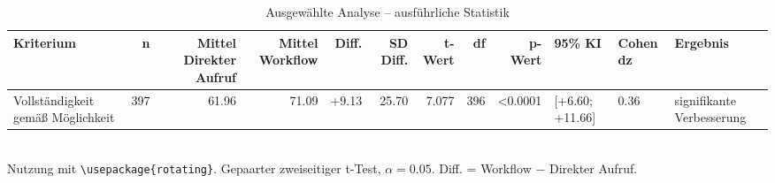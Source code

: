 \begin{table}
\centering
\caption{Ausgewählte Analyse -- ausführliche Statistik}
\begin{tabular}{lrrrrrrrrlll}
\toprule
Kriterium & n & Mittel Direkter Aufruf & Mittel Workflow & Diff. & SD Diff. & t-Wert & df & p-Wert & 95\% KI & Cohen dz & Ergebnis \\
\midrule
Vollständigkeit gemäß Möglichkeit & 397 & 61.96 & 71.09 & +9.13 & 25.70 & 7.077 & 396 & <0.0001 & [+6.60; +11.66] & 0.36 & signifikante Verbesserung \\
\bottomrule
\end{tabular}
\\[2mm]
\footnotesize Nutzung mit \texttt{\textbackslash usepackage\{rotating\}}. Gepaarter zweiseitiger t-Test, $\alpha=0.05$. Diff. = Workflow $-$ Direkter Aufruf.
\end{table}

